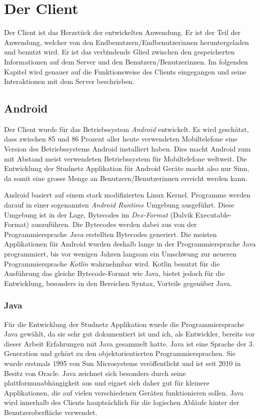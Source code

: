 \documentclass[../main.tex]{subfiles}
\begin{document}
	\chapter{Der Client}
	Der Client ist das Herzstück der entwickelten Anwendung. Er ist der Teil der Anwendung, welcher von den Endbenutzern/Endbenutzerinnen heruntergeladen und benutzt wird. Er ist das verbindende Glied zwischen den gespeicherten Informationen auf dem Server und den Benutzern/Benutzerinnen. Im folgenden Kapitel wird genauer auf die Funktionsweise des Clients eingegangen und seine Interaktionen mit dem Server beschrieben.
	
	\section{Android}
	Der Client wurde für das Betriebssystem \emph{Android} entwickelt. Es wird geschätzt, dass zwischen 85 und 86 Prozent aller heute verwendeten Mobiltelefone eine Version des Betriebssystems Android installiert haben. Dies macht Android zum mit Abstand meist verwendeten Betriebssystem für Mobiltelefone weltweit. Die Entwicklung der Studnetz Applikation für Android Geräte macht also nur Sinn, da somit eine grosse Menge an Benutzern/Benutzerinnen erreicht werden kann. \cite{android}
	
	Android basiert auf einem stark modifizierten Linux Kernel. Programme werden darauf in einer sogenannten \emph{Android Runtime} Umgebung ausgeführt. Diese Umgebung ist in der Lage, Bytecodes im \emph{Dex-Format} (Dalvik Executable-Format) auszuführen. Die Bytecodes werden dabei aus von der Programmiersprache \emph{Java} erstellten Bytecodes generiert. Die meisten Applikationen für Android wurden deshalb lange in der Programmiersprache Java programmiert, bis vor wenigen Jahren langsam ein Umschwung zur neueren Programmiersprache \emph{Kotlin} wahrnehmbar wird. Kotlin benutzt für die Ausführung das gleiche Bytecode-Format wie Java, bietet jedoch für die Entwicklung, besonders in den Bereichen Syntax, Vorteile gegenüber Java. \cite{androidJava}
	
	\subsection{Java}
	Für die Entwicklung der Studnetz Applikation wurde die Programmiersprache Java gewählt, da sie sehr gut dokumentiert ist und ich, als Entwickler, bereits vor dieser Arbeit Erfahrungen mit Java gesammelt hatte. Java ist eine Sprache der 3. Generation und gehört zu den objektorientierten Programmiersprachen. Sie wurde erstmals 1995 von Sun Microsystems veröffentlicht und ist seit 2010 in Besitz von Oracle. Java zeichnet sich besonders durch seine plattformunabhängigkeit aus und eignet sich daher gut für kleinere Applikationen, die auf vielen verschiedenen Geräten funktionieren sollen. Java wird innerhalb des Clients hauptsächlich für die logischen Abläufe hinter der Benutzeroberfläche verwendet. 
	
\end{document}
